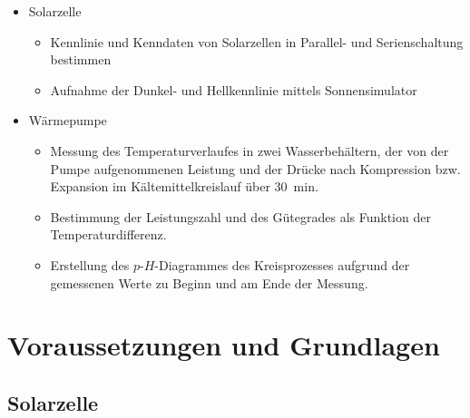 \documentclass[english, ngerman]{scrartcl}
\begin{document}
\begin{itemize}
    \item Solarzelle
          \begin{itemize}
              \item Kennlinie und Kenndaten von Solarzellen in Parallel- und Serienschaltung bestimmen
              \item Aufnahme der Dunkel- und Hellkennlinie mittels Sonnensimulator
          \end{itemize}
    \item Wärmepumpe
          \begin{itemize}
              \item Messung des Temperaturverlaufes in zwei Wasserbehältern, der von der Pumpe aufgenommenen Leistung und der Drücke nach Kompression bzw. Expansion im Kältemittelkreislauf über \SI{30}{min}.
              \item Bestimmung der Leistungszahl und des Gütegrades als Funktion der Temperaturdifferenz.
              \item Erstellung des $p$-$H$-Diagrammes des Kreisprozesses aufgrund der gemessenen Werte zu Beginn und am Ende der Messung.
          \end{itemize}
\end{itemize}



\section[Voraussetzungen und Grundlagen]{Voraussetzungen und Grundlagen \cite{ref:angabe_solar,ref:angabe_waerme}}

\subsection{Solarzelle}
\label{subsec:grundlagen_solar}
\end{document}

